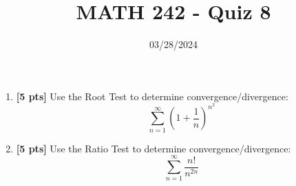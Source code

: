 \documentclass[12pt]{article}
\title{MATH 242 - Quiz 8}
\date{03/28/2024}
\begin{document}
\maketitle

\begin{enumerate}


\item \textbf{[5 pts]} Use the Root Test to determine convergence/divergence:
$$\sum_{n=1}^{\infty}\left(1+\frac{1}{n}\right)^{n^2}$$
\newpage

\item \textbf{[5 pts]}  Use the Ratio Test to determine convergence/divergence:
$$\sum_{n=1}^{\infty}\frac{n!}{n^{2n}}$$


\end{enumerate}
\end{document}
